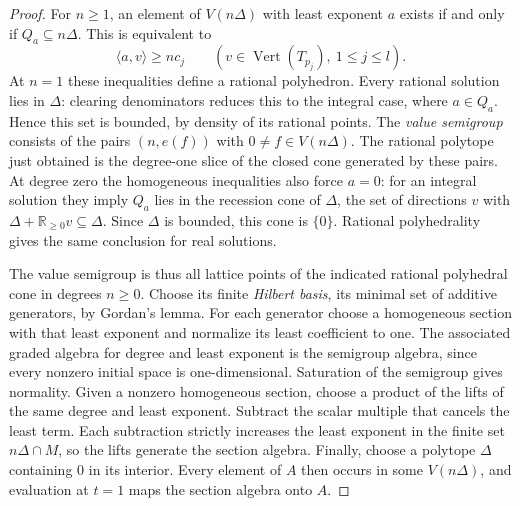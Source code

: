 \documentclass[11pt,reqno]{amsart}
\numberwithin{equation}{section}
\theoremstyle{definition}
\theoremstyle{remark}
\begin{document}
\begin{proof}
For \(n\ge1\), an element of \(V(n\Delta)\) with least exponent \(a\)
exists if and only if \(Q_a\subseteq n\Delta\). This is equivalent to
\[ \langle a,v\rangle\ge nc_j\qquad (v\in\operatorname{Vert}(T_{p_j}),\ 1\le j\le l). \]
At \(n=1\) these inequalities define a rational polyhedron.
Every rational solution lies in \(\Delta\): clearing denominators
reduces this to the integral case, where \(a\in Q_a\). Hence this
set is bounded, by density of its rational points. The \emph{value
semigroup} consists of the pairs \((n,e(f))\) with \(0\ne f\in V(n\Delta)\).
The rational polytope just obtained is the degree-one slice of the
closed cone generated by these pairs.
At degree zero the homogeneous inequalities also force \(a=0\):
for an integral solution they imply \(Q_a\) lies in the recession
cone of \(\Delta\), the set of directions \(v\) with
\(\Delta+\mathbb R_{\ge0}v\subseteq\Delta\). Since \(\Delta\) is
bounded, this cone is \(\{0\}\). Rational polyhedrality
gives the same conclusion for real solutions.

The value semigroup is thus all lattice points of the indicated
rational polyhedral cone in degrees \(n\ge0\). Choose its finite
\emph{Hilbert basis}, its minimal set of additive generators, by
Gordan's lemma. For each generator choose a
homogeneous section with that least exponent and normalize its
least coefficient to one. The associated graded algebra for degree
and least exponent is the semigroup algebra, since every nonzero
initial space is one-dimensional. Saturation of the semigroup gives
normality. Given a nonzero homogeneous section, choose a product
of the lifts of the same degree and least exponent. Subtract the
scalar multiple that cancels the least term. Each subtraction strictly
increases the least exponent in the finite set \(n\Delta\cap M\),
so the lifts generate the section algebra. Finally, choose a
polytope \(\Delta\) containing \(0\) in its interior.
Every element of \(A\) then occurs in some \(V(n\Delta)\), and
evaluation at \(t=1\) maps the section algebra onto \(A\).
\end{proof}
\end{document}
